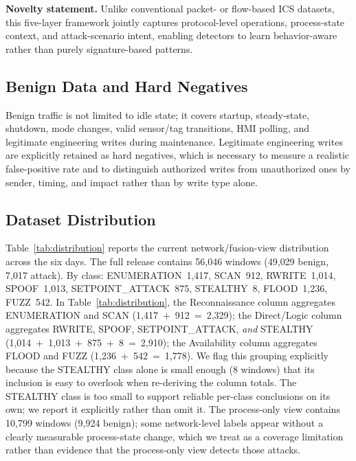 \documentclass[conference]{IEEEtran}
\begin{document}
\textbf{Novelty statement.} Unlike conventional packet- or flow-based ICS datasets, this five-layer framework jointly captures protocol-level operations, process-state context, and attack-scenario intent, enabling detectors to learn behavior-aware rather than purely signature-based patterns.

\subsection{Benign Data and Hard Negatives}
Benign traffic is not limited to idle state; it covers startup, steady-state, shutdown, mode changes, valid sensor/tag transitions, HMI polling, and legitimate engineering writes during maintenance. Legitimate engineering writes are explicitly retained as hard negatives, which is necessary to measure a realistic false-positive rate and to distinguish authorized writes from unauthorized ones by sender, timing, and impact rather than by write type alone.

\subsection{Dataset Distribution}
Table~\ref{tab:distribution} reports the current network/fusion-view distribution across the six days. The full release contains 56{,}046 windows (49{,}029 benign, 7{,}017 attack). By class: ENUMERATION~1{,}417, SCAN~912, RWRITE~1{,}014, SPOOF~1{,}013, SETPOINT\_ATTACK~875, STEALTHY~8, FLOOD~1{,}236, FUZZ~542. In Table~\ref{tab:distribution}, the Reconnaissance column aggregates ENUMERATION and SCAN (1{,}417~+~912~=~2{,}329); the Direct/Logic column aggregates RWRITE, SPOOF, SETPOINT\_ATTACK, \emph{and} STEALTHY (1{,}014~+~1{,}013~+~875~+~8~=~2{,}910); the Availability column aggregates FLOOD and FUZZ (1{,}236~+~542~=~1{,}778). We flag this grouping explicitly because the STEALTHY class alone is small enough (8 windows) that its inclusion is easy to overlook when re-deriving the column totals. The STEALTHY class is too small to support reliable per-class conclusions on its own; we report it explicitly rather than omit it. The process-only view contains 10{,}799 windows (9{,}924 benign); some network-level labels appear without a clearly measurable process-state change, which we treat as a coverage limitation rather than evidence that the process-only view detects those attacks.
\end{document}
